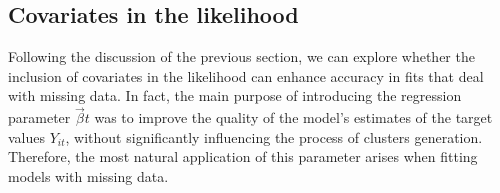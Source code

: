 \documentclass[12pt,	%
	a4paper,		%
	twoside,		%
	openright,		%
	titlepage,%
	]{book}
\theoremstyle{definition}
\begin{document}

\subsection{Covariates in the likelihood}
\label{Covariates in the likelihood}
Following the discussion of the previous section, we can explore whether the inclusion of covariates in the likelihood can enhance accuracy in fits that deal with missing data. In fact, the main purpose of introducing the regression parameter $\vec{\beta}t$ was to improve the quality of the model's estimates of the target values $Y_{it}$, without significantly influencing the process of clusters generation. Therefore, the most natural application of this parameter arises when fitting models with missing data.
\end{document}
